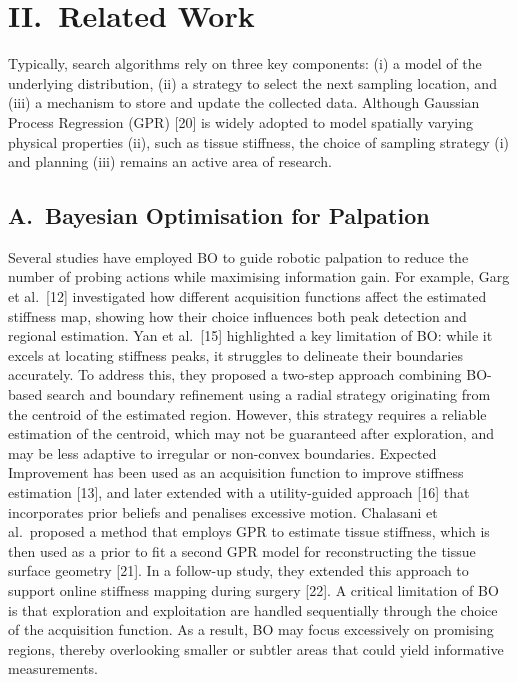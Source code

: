 \documentclass[11pt]{article}
\begin{document}
\section*{II.\ Related Work}

Typically, search algorithms rely on three key components: (i) a
model of the underlying distribution, (ii) a strategy to select the
next sampling location, and (iii) a mechanism to store and update the
collected data. Although Gaussian Process Regression (GPR) [20] is
widely adopted to model spatially varying physical properties (ii),
such as tissue stiffness, the choice of sampling strategy (i) and
planning (iii) remains an active area of research.

\subsection*{A.\ Bayesian Optimisation for Palpation}

Several studies have employed BO to guide robotic palpation to reduce
the number of probing actions while maximising information gain. For
example, Garg et al.\ [12] investigated how different acquisition
functions affect the estimated stiffness map, showing how their
choice influences both peak detection and regional estimation. Yan
et al.\ [15] highlighted a key limitation of BO: while it excels at
locating stiffness peaks, it struggles to delineate their boundaries
accurately. To address this, they proposed a two-step approach
combining BO-based search and boundary refinement using a radial
strategy originating from the centroid of the estimated region.
However, this strategy requires a reliable estimation of the
centroid, which may not be guaranteed after exploration, and may be
less adaptive to irregular or non-convex boundaries. Expected
Improvement has been used as an acquisition function to improve
stiffness estimation [13], and later extended with a utility-guided
approach [16] that incorporates prior beliefs and penalises excessive
motion. Chalasani et al.\ proposed a method that employs GPR to
estimate tissue stiffness, which is then used as a prior to fit a
second GPR model for reconstructing the tissue surface geometry [21].
In a follow-up study, they extended this approach to support online
stiffness mapping during surgery [22]. A critical limitation of BO
is that exploration and exploitation are handled sequentially through
the choice of the acquisition function. As a result, BO may focus
excessively on promising regions, thereby overlooking smaller or
subtler areas that could yield informative measurements.
\end{document}
